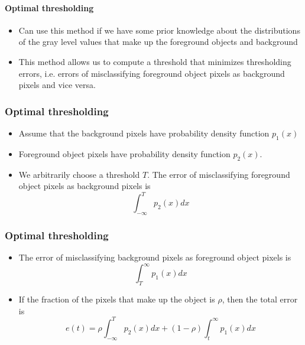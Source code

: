 \begin{frame}
\framesubtitle{Optimal thresholding}
\logoCSIPCPL\mypagenum
	\begin{itemize}
		\item Can use this method if we have some prior knowledge about the distributions of the gray level values that make up the foreground objects and background
		\item This method allows us to compute a threshold that minimizes thresholding errors, i.e. errors of misclassifying foreground object pixels as background pixels and vice versa.
	\end{itemize}
\end{frame}






\begin{frame}
\frametitle{Optimal thresholding}
\logoCSIPCPL\mypagenum
	\begin{itemize}
		\item Assume that the background pixels have probability density function $p_1(x)$
		\item Foreground object pixels have probability density function $p_2(x)$.
		\item We arbitrarily choose a threshold $T$. The error of misclassifying foreground object pixels as background pixels is
		\begin{equation}
			\int_{-\infty}^{T} p_2(x) dx
		\end{equation}
	\end{itemize}
\end{frame}







\begin{frame}
\frametitle{Optimal thresholding}
\logoCSIPCPL\mypagenum
	\begin{itemize}
		\item The error of misclassifying background pixels as foreground object pixels is
			\begin{equation}
				\int_{T}^{\infty} p_1(x) dx
			\end{equation}
		\item If the fraction of the pixels that make up the object is $\rho$, then the total error is
			\begin{equation}
				e(t) = \rho\int_{-\infty}^{T} p_2(x) dx + (1-\rho) \int_{t}^{\infty}p_1(x) dx
			\end{equation}
	\end{itemize}
\end{frame}





